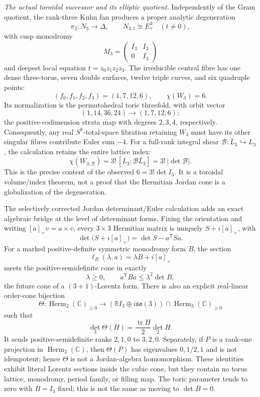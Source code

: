 \documentclass[10pt,letterpaper]{article}
\begin{document}
\medskip\noindent
\textit{The actual toroidal successor and its elliptic quotient.}
Independently of the Gram quotient, the rank-three Kuhn fan produces a proper
analytic degeneration
\[
 \pi_3:N_3\longrightarrow\Delta,\qquad
 N_{3,t}\cong E_\tau^3\quad(t\ne0),
\]
with cusp monodromy
\[
 M_3=\begin{pmatrix}I_3&I_3\\0&I_3\end{pmatrix}
\]
and deepest local equation \(t=z_0z_1z_2z_3\).  The irreducible central fibre
has one dense three-torus, seven double surfaces, twelve triple curves, and
six quadruple points:
\[
 (f_0,f_1,f_2,f_3)=(1,7,12,6),\qquad \chi(W_3)=6.
\]
Its normalization is the permutohedral toric threefold, with orbit vector
\[
 (1,14,36,24)\longrightarrow(1,7,12,6);
\]
the positive-codimension strata map with degrees \(2,3,4\), respectively.
Consequently, any real \(S^8\)-total-space fibration retaining \(W_3\) must
have its other singular fibres contribute Euler sum \(-4\).
For a full-rank integral shear
\(\mathcal B:\bar L_3\hookrightarrow L_3\), the calculation retains the
entire lattice index:
\[
 \chi(W_{3,\mathcal B})
 =3!\,[L_3:\mathcal B\bar L_3]
 =3!\,|\det\mathcal B|.
\]
This is the precise content of the observed \(6=3!\det I_3\).  It is a
toroidal volume/index theorem, not a proof that the Hermitian Jordan cone is
a globalization of the degeneration.

The selectively corrected Jordan determinant/Euler calculation adds an exact algebraic bridge at the
level of determinant forms.  Fixing the orientation and writing
\([a]_{\times}v=a\times v\), every \(3\times3\) Hermitian matrix is uniquely
\(S+i[a]_{\times}\), with
\[
 \boxed{\det\bigl(S+i[a]_{\times}\bigr)=\det S-a^{\mathsf T}Sa.}
\]
For a marked positive-definite symmetric monodromy form \(B\), the section
\[
 \ell_B(\lambda,a)=\lambda B+i[a]_{\times}
\]
meets the positive-semidefinite cone in exactly
\[
 \lambda\geq0,\qquad a^{\mathsf T}Ba\leq\lambda^2\det B,
\]
the future cone of a \((3+1)\)-Lorentz form.  There is also an explicit
real-linear order-cone bijection
\[
 \Theta:\operatorname{Herm}_2(\mathbb C)_{\geq0}
 \longrightarrow
 (\mathbb RI_3\oplus i\mathfrak{so}(3))
 \cap\operatorname{Herm}_3(\mathbb C)_{\geq0}
\]
such that
\[
 \det_3\Theta(H)=\frac{\operatorname{tr}H}{2}\det_2H.
\]
It sends positive-semidefinite ranks \(2,1,0\) to \(3,2,0\).  Separately,
if \(P\) is a rank-one projection in \(\operatorname{Herm}_2(\mathbb C)\),
then \(\Theta(P)\) has eigenvalues \(0,1/2,1\) and is not idempotent; hence
\(\Theta\) is not a Jordan-algebra homomorphism.  These identities exhibit
literal Lorentz sections inside the cubic cone, but
they contain no torus lattice, monodromy, period family, or filling map.  The
toric parameter tends to zero with \(B=I_3\) fixed; this is not the same as
moving to \(\det B=0\).
\end{document}
